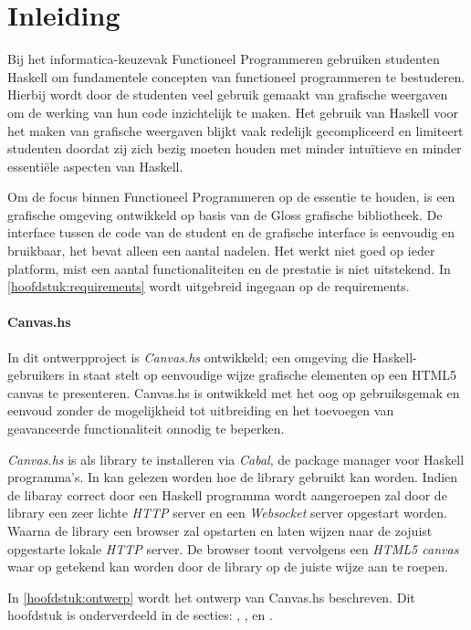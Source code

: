 \chapter{Inleiding}
Bij het informatica-keuzevak Functioneel Programmeren gebruiken studenten Haskell om fundamentele concepten van functioneel programmeren te bestuderen. Hierbij wordt door de studenten veel gebruik gemaakt van grafische weergaven om de werking van hun code inzichtelijk te maken. Het gebruik van Haskell voor het maken van grafische weergaven blijkt vaak redelijk gecompliceerd en limiteert studenten doordat zij zich bezig moeten houden met minder intuïtieve en minder essentiële aspecten van Haskell.

Om de focus binnen Functioneel Programmeren op de essentie te houden, is een grafische omgeving ontwikkeld op basis van de Gloss grafische bibliotheek. De interface tussen de code van de student en de grafische interface is eenvoudig en bruikbaar, het bevat alleen een aantal nadelen. Het werkt niet goed op ieder platform, mist een aantal functionaliteiten en de prestatie is niet uitstekend. In \autoref{hoofdstuk:requirements} wordt uitgebreid ingegaan op de requirements.

\subsubsection{Canvas.hs}
In dit ontwerpproject is \emph{Canvas.hs} ontwikkeld; een omgeving die Haskell-gebruikers in staat stelt op eenvoudige wijze grafische elementen op een HTML5 canvas te presenteren. Canvas.hs is ontwikkeld met het oog op gebruiksgemak en eenvoud zonder de mogelijkheid tot uitbreiding en het toevoegen van geavanceerde functionaliteit onnodig te beperken.

\emph{Canvas.hs} is als library te installeren via \emph{Cabal}, de package manager voor Haskell programma's. In  kan gelezen worden hoe de library gebruikt kan worden. Indien de libaray correct door een Haskell programma wordt aangeroepen zal door de library een zeer lichte \emph{HTTP} server en een \emph{Websocket} server opgestart worden. Waarna de library een browser zal opstarten en laten wijzen naar de zojuist opgestarte lokale \emph{HTTP} server. De browser toont vervolgens een \emph{HTML5 canvas} waar op getekend kan worden door de library op de juiste wijze aan te roepen.

 In  \autoref{hoofdstuk:ontwerp} wordt het ontwerp van Canvas.hs beschreven. Dit hoofdstuk is onderverdeeld in de secties: , ,  en .

